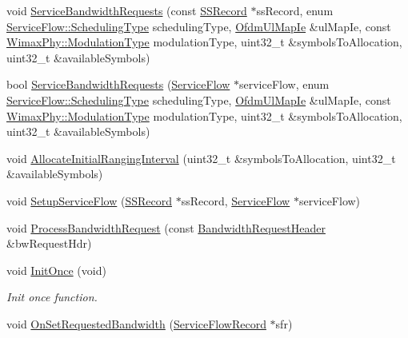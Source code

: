 \begin{DoxyCompactItemize}
\item 
void \hyperlink{classns3_1_1UplinkSchedulerSimple_ad420cfa439ba7c319fab7dd0db299408}{Service\+Bandwidth\+Requests} (const \hyperlink{classns3_1_1SSRecord}{S\+S\+Record} $\ast$ss\+Record, enum \hyperlink{classns3_1_1ServiceFlow_a7990ba10be1e098328fd1e6382a26235}{Service\+Flow\+::\+Scheduling\+Type} scheduling\+Type, \hyperlink{classns3_1_1OfdmUlMapIe}{Ofdm\+Ul\+Map\+Ie} \&ul\+Map\+Ie, const \hyperlink{classns3_1_1WimaxPhy_a044c5d8a48ca992c39c2a946f6e755fa}{Wimax\+Phy\+::\+Modulation\+Type} modulation\+Type, uint32\+\_\+t \&symbols\+To\+Allocation, uint32\+\_\+t \&available\+Symbols)
\item 
bool \hyperlink{classns3_1_1UplinkSchedulerSimple_a0e90e6596f780980d49cf6968cebb5c2}{Service\+Bandwidth\+Requests} (\hyperlink{classns3_1_1ServiceFlow}{Service\+Flow} $\ast$service\+Flow, enum \hyperlink{classns3_1_1ServiceFlow_a7990ba10be1e098328fd1e6382a26235}{Service\+Flow\+::\+Scheduling\+Type} scheduling\+Type, \hyperlink{classns3_1_1OfdmUlMapIe}{Ofdm\+Ul\+Map\+Ie} \&ul\+Map\+Ie, const \hyperlink{classns3_1_1WimaxPhy_a044c5d8a48ca992c39c2a946f6e755fa}{Wimax\+Phy\+::\+Modulation\+Type} modulation\+Type, uint32\+\_\+t \&symbols\+To\+Allocation, uint32\+\_\+t \&available\+Symbols)
\item 
void \hyperlink{classns3_1_1UplinkSchedulerSimple_a113550ccdc47d1ee91efe0b3cc801824}{Allocate\+Initial\+Ranging\+Interval} (uint32\+\_\+t \&symbols\+To\+Allocation, uint32\+\_\+t \&available\+Symbols)
\item 
void \hyperlink{classns3_1_1UplinkSchedulerSimple_a88882b7e7a40a90dc2e9e7e1fb836004}{Setup\+Service\+Flow} (\hyperlink{classns3_1_1SSRecord}{S\+S\+Record} $\ast$ss\+Record, \hyperlink{classns3_1_1ServiceFlow}{Service\+Flow} $\ast$service\+Flow)
\item 
void \hyperlink{classns3_1_1UplinkSchedulerSimple_a6a9666857171c7bbeb29e85e731c2f23}{Process\+Bandwidth\+Request} (const \hyperlink{classns3_1_1BandwidthRequestHeader}{Bandwidth\+Request\+Header} \&bw\+Request\+Hdr)
\item 
void \hyperlink{classns3_1_1UplinkSchedulerSimple_a075911b46c3528c4adc05ef7236fdad6}{Init\+Once} (void)
\begin{DoxyCompactList}\small\item\em Init once function. \end{DoxyCompactList}\item 
void \hyperlink{classns3_1_1UplinkSchedulerSimple_aaa8e256d55a73d4fd25a04c556e4104a}{On\+Set\+Requested\+Bandwidth} (\hyperlink{classns3_1_1ServiceFlowRecord}{Service\+Flow\+Record} $\ast$sfr)
\end{DoxyCompactItemize}
